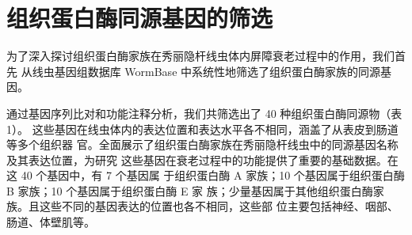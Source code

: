 \section{组织蛋白酶同源基因的筛选}

为了深入探讨组织蛋白酶家族在秀丽隐杆线虫体内屏障衰老过程中的作用，我们首先 从线虫基因组数据库 WormBase 中系统性地筛选了组织蛋白酶家族的同源基因。

通过基因序列比对和功能注释分析，我们共筛选出了 40 种组织蛋白酶同源物（表1）。 这些基因在线虫体内的表达位置和表达水平各不相同，涵盖了从表皮到肠道等多个组织器  官。全面展示了组织蛋白酶家族在秀丽隐杆线虫中的同源基因名称及其表达位置，为研究 这些基因在衰老过程中的功能提供了重要的基础数据。在这 40 个基因中，有 7 个基因属  于组织蛋白酶 A 家族；10 个基因属于组织蛋白酶 B 家族；10 个基因属于组织蛋白酶 E 家  族；少量基因属于其他组织蛋白酶家族。且这些不同的基因表达的位置也各不相同，这些部 位主要包括神经、咽部、肠道、体壁肌等。

